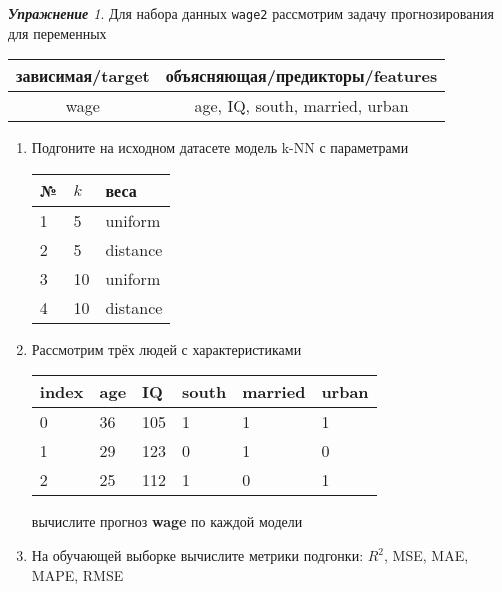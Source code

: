 \documentclass[a4,12pt]{article}
\theoremstyle{remark}
\newtheorem{exercise}{\textbf{Упражнение}}[section]
\begin{document}
\begin{exercise}
Для набора данных \texttt{wage2} рассмотрим задачу прогнозирования
для переменных
\begin{center}
	\begin{tabular}{|c|c|}\hline
		зависимая/target & объясняющая/предикторы/features \\ \hline
		wage & age, IQ, south, married, urban \\ \hline
	\end{tabular}
\end{center}
\begin{enumerate}
	\item Подгоните на исходном датасете модель k-NN с параметрами
	\begin{center}
		\begin{tabular}{|l|l|l|}\hline
		№ & \(k\) & веса \\ \hline
		1 & 5 & uniform \\
		2 & 5 & distance \\
		3 & 10 & uniform \\
		4 & 10 & distance \\ \hline
		\end{tabular}
	\end{center}
	\item Рассмотрим трёх людей с характеристиками
	\begin{center}
		\begin{tabular}{|l||l|l|l|l|l|}\hline
			index & age & IQ & south & married & urban \\ \hline\hline
			0 & 36 & 105 & 1 & 1 & 1 \\
			1 & 29 & 123 & 0 & 1 & 0 \\
			2 & 25 & 112 & 1 & 0 & 1 \\ \hline
		\end{tabular}
	\end{center}
	вычислите прогноз \textbf{wage} по каждой модели

	\item На обучающей выборке вычислите метрики подгонки: \(R^2\), 
	MSE, MAE, MAPE, RMSE
\end{enumerate}
\end{exercise}
\end{document}
